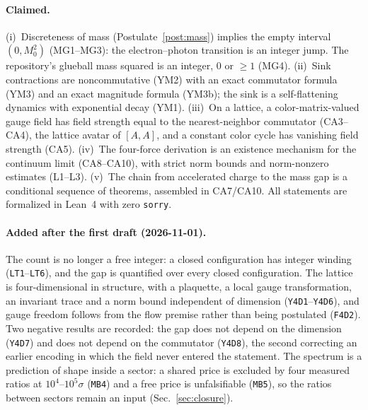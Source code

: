 \documentclass[aps,prd,preprint,superscriptaddress,amsmath,amssymb]{revtex4-2}
\begin{document}
\paragraph{Claimed.}
(i)~Discreteness of mass (Postulate~\ref{post:mass}) implies the
empty interval $(0,M_0^2)$ (MG1--MG3): the electron--photon
transition is an integer jump.  The repository's glueball mass
squared is an integer, $0$ or $\ge1$ (MG4).  (ii)~Sink contractions are
noncommutative (YM2) with an exact commutator formula (YM3) and an
exact magnitude formula (YM3b); the sink is a self-flattening
dynamics with exponential decay (YM1).  (iii)~On a lattice, a
color-matrix-valued gauge field has field strength equal to the
nearest-neighbor commutator (CA3--CA4), the lattice avatar of
$[A,A]$, and a constant color cycle has vanishing field strength
(CA5).  (iv)~The four-force derivation is an existence mechanism for
the continuum limit (CA8--CA10), with strict norm bounds and
norm-nonzero estimates (L1--L3).  (v)~The chain from accelerated
charge to the mass gap is a conditional sequence of theorems,
assembled in CA7/CA10.  All statements are formalized in Lean~4 with
zero \texttt{sorry}.

\paragraph{Added after the first draft (2026-11-01).}
The count is no longer a free integer: a closed configuration has integer
winding (\texttt{LT1}--\texttt{LT6}), and the gap is quantified over
every closed configuration.  The lattice is four-dimensional in
structure, with a plaquette, a local gauge transformation, an invariant
trace and a norm bound independent of dimension
(\texttt{Y4D1}--\texttt{Y4D6}), and gauge freedom follows from the flow
premise rather than being postulated (\texttt{F4D2}).  Two negative
results are recorded: the gap does not depend on the dimension
(\texttt{Y4D7}) and does not depend on the commutator (\texttt{Y4D8}),
the second correcting an earlier encoding in which the field never entered
the statement.  The spectrum is a prediction of shape inside a sector: a
shared price is excluded by four measured ratios at
$10^4$--$10^5\sigma$ (\texttt{MB4}) and a free price is unfalsifiable
(\texttt{MB5}), so the ratios between sectors remain an input
(Sec.~\ref{sec:closure}).
\end{document}
